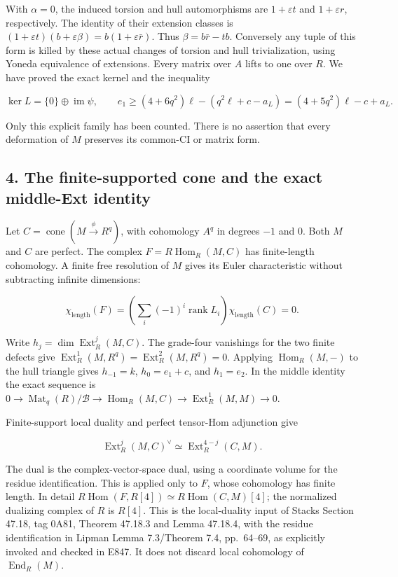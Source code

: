 With \(\alpha=0\), the induced torsion and hull automorphisms are
\(1+\varepsilon t\) and \(1+\varepsilon r\), respectively. The
identity of their extension classes is
\((1+\varepsilon t)(b+\varepsilon\beta)
 =b(1+\varepsilon\bar r)\). Thus
\(\beta=b\bar r-tb\). Conversely any tuple of this form is killed
by these actual changes of torsion and hull trivialization, using
Yoneda equivalence of extensions. Every matrix over \(A\) lifts to
one over \(R\). We have proved the exact kernel and the inequality

\[
 \ker L=\{0\}\oplus\operatorname{im}\psi,
 \qquad
 e_1\ge(4+6q^2)\ell-(q^2\ell+c-a_L)
          =(4+5q^2)\ell-c+a_L.
 \tag{MC.13}
\]

Only this explicit family has been counted. There is no assertion that
every deformation of \(M\) preserves its common-CI or matrix form.

\subsection{4. The finite-supported cone and the exact middle-Ext identity}\label{SF-E848:s4}

Let \(C=\operatorname{cone}(M\xrightarrow{\phi}R^q)\), with
cohomology \(A^q\) in degrees \(-1\) and \(0\). Both \(M\) and
\(C\) are perfect. The complex \(F=R\operatorname{Hom}_R(M,C)\)
has finite-length cohomology. A finite free resolution of \(M\)
gives its Euler characteristic without subtracting infinite dimensions:

\[
 \chi_{\mathrm{length}}(F)
   =\left(\sum_i(-1)^i\operatorname{rank}L_i\right)
          \chi_{\mathrm{length}}(C)=0.
 \tag{MC.14}
\]

Write \(h_j=\dim\operatorname{Ext}^j_R(M,C)\). The grade-four
vanishings for the two finite defects give
\(\operatorname{Ext}^1_R(M,R^q)=\operatorname{Ext}^2_R(M,R^q)=0\).
Applying \(\operatorname{Hom}_R(M,-)\) to the hull triangle gives
\(h_{-1}=k\), \(h_0=e_1+c\), and \(h_1=e_2\). In the middle
identity the exact sequence is
\(0\to\operatorname{Mat}_q(R)/\mathcal B\to
\operatorname{Hom}_R(M,C)\to\operatorname{Ext}^1_R(M,M)\to0\).

Finite-support local duality and perfect tensor-Hom adjunction give

\[
 \operatorname{Ext}^j_R(M,C)^\vee
          \simeq\operatorname{Ext}^{4-j}_R(C,M).
 \tag{MC.15}
\]

The dual is the complex-vector-space dual, using a coordinate volume
for the residue identification. This is applied only to \(F\), whose
cohomology has finite length. In detail
\(R\operatorname{Hom}(F,R[4])
 \simeq R\operatorname{Hom}(C,M)[4]\); the normalized dualizing
complex of \(R\) is \(R[4]\). This is the local-duality input of
Stacks Section 47.18, tag 0A81, Theorem 47.18.3 and Lemma 47.18.4,\cite{SFStacksE847LocalDuality}
with the residue identification in Lipman Lemma 7.3/Theorem 7.4,
pp.~64--69,\cite{SFLipman1984} as explicitly invoked and checked in E847. It does not
discard local cohomology of \(\operatorname{End}_R(M)\).

